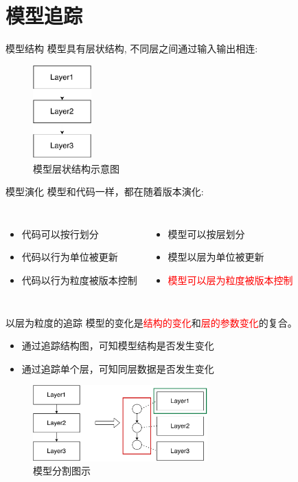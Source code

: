 \documentclass{beamer}
\begin{document}
\section{模型追踪}
\begin{frame}{模型结构}
模型具有层状结构, 不同层之间通过输入输出相连:
\begin{figure}
    \centering
    \includegraphics[width=0.2\textwidth]{layer-structure.pdf}
    \caption{模型层状结构示意图}
    \label{fig:layer-structure}
\end{figure}
\end{frame}
\begin{frame}{模型演化}
模型和代码一样，都在随着版本演化:
\begin{columns}
\begin{itemize}
    \item 代码可以按行划分
    \item 代码以行为单位被更新
    \item 代码以行为粒度被版本控制
\end{itemize}

\begin{itemize}
    \item 模型可以按层划分
    \item 模型以层为单位被更新
    \item \textcolor{red}{模型可以层为粒度被版本控制}
\end{itemize}
\end{columns}
\end{frame}

\begin{frame}{以层为粒度的追踪}
模型的变化是\textcolor{red}{结构的变化}和\textcolor{red}{层的参数变化}的复合。\\
\begin{itemize}
    \item 通过追踪结构图，可知模型结构是否发生变化
    \item 通过追踪单个层，可知同层数据是否发生变化
\end{itemize}
\begin{figure}
    \centering
    \includegraphics[width=0.6\textwidth]{graph-format.pdf}
    \caption{模型分割图示}
    \label{fig:graph-format}
\end{figure}
\end{frame}
\end{document}
